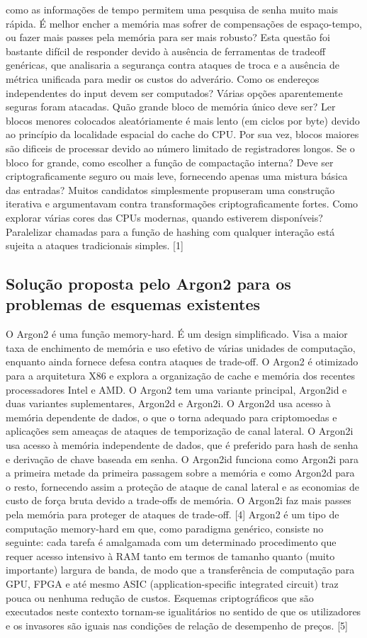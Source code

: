 \documentclass[conference]{IEEEtran}
\begin{document}
como as informações de tempo permitem uma pesquisa de senha muito mais rápida. 
É melhor encher a memória mas sofrer de compensações de espaço-tempo, ou fazer mais passes pela memória para ser mais robusto? 
Esta questão foi bastante difícil de responder devido à ausência de ferramentas de tradeoff genéricas, 
que analisaria a segurança contra ataques de troca e a ausência de métrica unificada para medir os custos do adverário.
Como os endereços independentes do input devem ser computados? Várias opções aparentemente seguras foram atacadas.
Quão grande bloco de memória único deve ser? Ler blocos menores colocados aleatóriamente é mais lento (em ciclos por byte) 
devido ao princípio da localidade espacial do cache do CPU. Por sua vez, 
blocos maiores são dificeis de processar devido ao número limitado de registradores longos. 
Se o bloco for grande, como escolher a função de compactação interna? Deve ser criptograficamente seguro ou mais leve, 
fornecendo apenas uma mistura básica das entradas? Muitos candidatos simplesmente propuseram uma construção iterativa e 
argumentavam contra transformações criptograficamente fortes. 
Como explorar várias cores das CPUs modernas, quando estiverem disponíveis? 
Paralelizar chamadas para a função de hashing com qualquer interação está sujeita a ataques tradicionais simples. [1]

\subsection{Solução proposta pelo Argon2 para os problemas de esquemas existentes}

O Argon2 é uma função memory-hard. É um design simplificado. 
Visa a maior taxa de enchimento de memória e uso efetivo de várias unidades de computação, 
enquanto ainda fornece defesa contra ataques de trade-off. 
O Argon2 é otimizado para a arquitetura X86 e explora a organização de cache e memória dos recentes processadores Intel e AMD. 
O Argon2 tem uma variante principal, Argon2id e duas variantes suplementares, Argon2d e Argon2i. 
O Argon2d usa acesso à memória dependente de dados, o que o torna adequado para criptomoedas e 
aplicações sem ameaças de ataques de temporização de canal lateral. O Argon2i usa acesso à memória independente de dados, 
que é preferido para hash de senha e derivação de chave baseada em senha. 
O Argon2id funciona como Argon2i para a primeira metade da primeira passagem sobre a memória e como Argon2d para o resto, 
fornecendo assim a proteção de ataque de canal lateral e as economias de custo de força bruta devido a trade-offs de memória. 
O Argon2i faz mais passes pela memória para proteger de ataques de trade-off. [4]
Argon2 é um tipo de computação memory-hard em que, como paradigma genérico, consiste no seguinte: 
cada tarefa é amalgamada com um determinado procedimento que requer acesso intensivo à RAM tanto em termos de tamanho quanto 
(muito importante) largura de banda, de modo que a transferência de computação para GPU, 
FPGA e até mesmo ASIC (application-specific integrated circuit) traz pouca ou nenhuma redução de custos. 
Esquemas criptográficos que são executados neste contexto tornam-se igualitários no sentido de que os utilizadores e 
os invasores são iguais nas condições de relação de desempenho de preços. [5]
\end{document}
